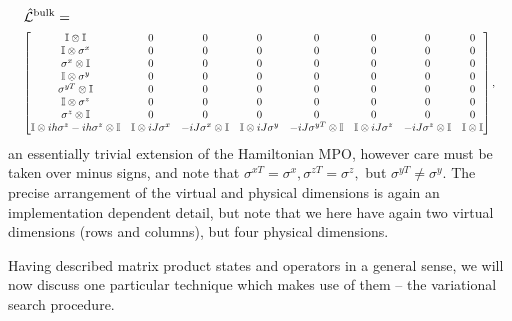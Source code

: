  \begin{align}
 	&\hat{\mathcal{L}}^{\mathrm{bulk}} = \notag \\
 	&\resizebox{0.98\linewidth}{!}{%
 	\(\begin{bmatrix}
 		\mathbb{I} \otimes \mathbb{I} & 0 & 0 & 0 & 0 & 0 & 0 & 0 \\
 		\mathbb{I} \otimes \sigma^{x} & 0 & 0 & 0 & 0 & 0 & 0 & 0 \\
 		\sigma^{x} \otimes \mathbb{I} & 0 & 0 & 0 & 0 & 0 & 0 & 0 \\
 		\mathbb{I} \otimes \sigma^{y} & 0 & 0 & 0 & 0 & 0 & 0 & 0 \\
 		\sigma^{yT} \otimes \mathbb{I} & 0 & 0 & 0 & 0 & 0 & 0 & 0 \\
 		\mathbb{I} \otimes \sigma^{z} & 0 & 0 & 0 & 0 & 0 & 0 & 0 \\
 		\sigma^{z} \otimes \mathbb{I} & 0 & 0 & 0 & 0 & 0 & 0 & 0 \\
 		\mathbb{I} \otimes ih\sigma^{z} - ih\sigma^{z} \otimes \mathbb{I} & \mathbb{I} \otimes iJ\sigma^{x} & -iJ\sigma^{x} \otimes \mathbb{I} & \mathbb{I} \otimes iJ\sigma^{y} & -iJ\sigma^{yT} \otimes \mathbb{I} & \mathbb{I} \otimes iJ\sigma^{z} & -iJ\sigma^{z} \otimes \mathbb{I} & \mathbb{I} \otimes \mathbb{I}
 	\end{bmatrix},\)}
 	\label{eq:mpo1-9}
 \end{align}
 an essentially trivial extension of the Hamiltonian MPO, however care must be taken over minus signs, and note that \(\sigma^{xT} = \sigma^{x}, \sigma^{zT} = \sigma^{z},\) but \(\sigma^{yT} \neq \sigma^{y}\). The precise arrangement of the virtual and physical dimensions is again an implementation dependent detail, but note that we here have again two virtual dimensions (rows and columns), but four physical dimensions.

 Having described matrix product states and operators in a general sense, we will now discuss one particular technique which makes use of them -- the variational search procedure.


